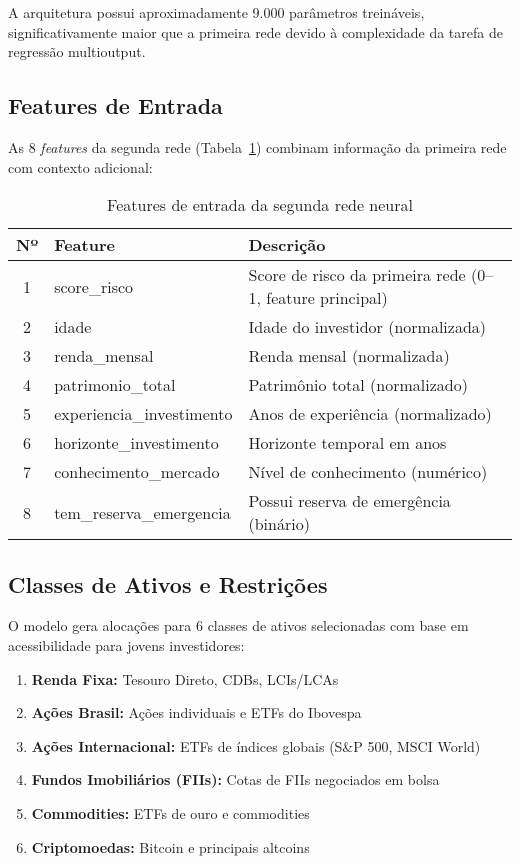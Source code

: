 A arquitetura possui aproximadamente 9.000 parâmetros treináveis, significativamente maior que a primeira rede devido à complexidade da tarefa de regressão multioutput.

\subsection{Features de Entrada}

As 8 \textit{features} da segunda rede (Tabela~\ref{tab:features_rede2}) combinam informação da primeira rede com contexto adicional:

\begin{table}[htbp]
\centering
\caption{Features de entrada da segunda rede neural}
\label{tab:features_rede2}
\begin{tabular}{@{}clp{7.5cm}@{}}
\toprule
\textbf{Nº} & \textbf{Feature} & \textbf{Descrição} \\ \midrule
1 & score\_risco & Score de risco da primeira rede (0--1, feature principal) \\
2 & idade & Idade do investidor (normalizada) \\
3 & renda\_mensal & Renda mensal (normalizada) \\
4 & patrimonio\_total & Patrimônio total (normalizado) \\
5 & experiencia\_investimento & Anos de experiência (normalizado) \\
6 & horizonte\_investimento & Horizonte temporal em anos \\
7 & conhecimento\_mercado & Nível de conhecimento (numérico) \\
8 & tem\_reserva\_emergencia & Possui reserva de emergência (binário) \\ \bottomrule
\end{tabular}
\end{table}

\subsection{Classes de Ativos e Restrições}

O modelo gera alocações para 6 classes de ativos selecionadas com base em acessibilidade para jovens investidores:

\begin{enumerate}
    \item \textbf{Renda Fixa:} Tesouro Direto, CDBs, LCIs/LCAs
    \item \textbf{Ações Brasil:} Ações individuais e ETFs do Ibovespa
    \item \textbf{Ações Internacional:} ETFs de índices globais (S\&P 500, MSCI World)
    \item \textbf{Fundos Imobiliários (FIIs):} Cotas de FIIs negociados em bolsa
    \item \textbf{Commodities:} ETFs de ouro e commodities
    \item \textbf{Criptomoedas:} Bitcoin e principais altcoins
\end{enumerate}

